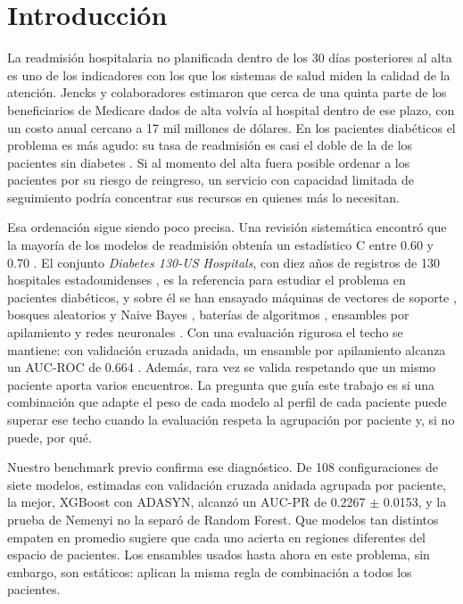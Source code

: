 \documentclass[pdflatex,sn-mathphys-num]{sn-jnl}
\theoremstyle{plain}
\begin{document}
\section{Introducción}\label{sec:intro}

La readmisión hospitalaria no planificada dentro de los 30 días posteriores al alta es uno de los indicadores con los que los sistemas de salud miden la calidad de la atención. Jencks y colaboradores \cite{bib_jencks} estimaron que cerca de una quinta parte de los beneficiarios de Medicare dados de alta volvía al hospital dentro de ese plazo, con un costo anual cercano a 17 mil millones de dólares. En los pacientes diabéticos el problema es más agudo: su tasa de readmisión es casi el doble de la de los pacientes sin diabetes \cite{bib_liu_2024}. Si al momento del alta fuera posible ordenar a los pacientes por su riesgo de reingreso, un servicio con capacidad limitada de seguimiento podría concentrar sus recursos en quienes más lo necesitan.

Esa ordenación sigue siendo poco precisa. Una revisión sistemática encontró que la mayoría de los modelos de readmisión obtenía un estadístico C entre 0.60 y 0.70 \cite{bib_kansagara}. El conjunto \emph{Diabetes 130-US Hospitals}, con diez años de registros de 130 hospitales estadounidenses \cite{bib_strack}, es la referencia para estudiar el problema en pacientes diabéticos, y sobre él se han ensayado máquinas de vectores de soporte \cite{bib_cui_2018}, bosques aleatorios y Naive Bayes \cite{bib_shang_2021, bib_neto_2021}, baterías de algoritmos \cite{bib_liu_2024}, ensambles por apilamiento \cite{bib_lu_2022, bib_salim_2026} y redes neuronales \cite{bib_ram_2023, bib_garcia_mosquera_2025}. Con una evaluación rigurosa el techo se mantiene: con validación cruzada anidada, un ensamble por apilamiento alcanza un AUC-ROC de 0.664 \cite{bib_salim_2026}. Además, rara vez se valida respetando que un mismo paciente aporta varios encuentros. La pregunta que guía este trabajo es si una combinación que adapte el peso de cada modelo al perfil de cada paciente puede superar ese techo cuando la evaluación respeta la agrupación por paciente y, si no puede, por qué.

Nuestro benchmark previo confirma ese diagnóstico. De 108 configuraciones de siete modelos, estimadas con validación cruzada anidada agrupada por paciente, la mejor, XGBoost \cite{bib_chen} con ADASYN, alcanzó un AUC-PR de 0.2267 $\pm$ 0.0153, y la prueba de Nemenyi \cite{bib_demsar} no la separó de Random Forest. Que modelos tan distintos empaten en promedio sugiere que cada uno acierta en regiones diferentes del espacio de pacientes. Los ensambles usados hasta ahora en este problema, sin embargo, son estáticos: aplican la misma regla de combinación a todos los pacientes.
\end{document}
